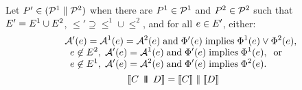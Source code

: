 \begin{definition}
  Let $P' \in (\mathcal{P}^1 \parallel \mathcal{P}^2)$
  when there are $P^1 \in \mathcal{P}^1$ and $P^2 \in \mathcal{P}^2$
  such that
$E' = E^1 \cup E^2$,
${\le'}\supseteq{\le^1}\cup{\le^2}$, and for all $e\in E'$,
either:
\begin{gather*}
  \begin{aligned}
    \;\;&\mathcal{A}'(e) = \mathcal{A}^1(e) = \mathcal{A}^2(e) \;\allowbreak\text{and}\allowbreak\; \Phi'(e) \; \allowbreak\text{implies}\allowbreak\; \Phi^1(e) \lor \Phi^2(e),\\[-1ex]
    &\;\;e \not\in E^2,\; \mathcal{A}'(e) = \mathcal{A}^1(e) \;\allowbreak\text{and}\allowbreak\; \Phi'(e) \; \allowbreak\text{implies}\allowbreak\; \Phi^1(e),\; \; \allowbreak\text{or}\allowbreak\;\\[-1ex]
    &\;\;e \not\in E^1,\; \mathcal{A}'(e) = \mathcal{A}^2(e) \;\allowbreak\text{and}\allowbreak\; \Phi'(e) \; \allowbreak\text{implies}\allowbreak\; \Phi^2(e).
  \end{aligned}
  \\
\begin{aligned}
  \llbracket C \,\mathbin{\texttt{\textbf{|}}\mkern-6mu\texttt{\textbf{|}}}\, D\rrbracket & =
  \llbracket C\rrbracket \parallel \llbracket D\rrbracket 
\end{aligned}
\end{gather*}
\end{definition}

